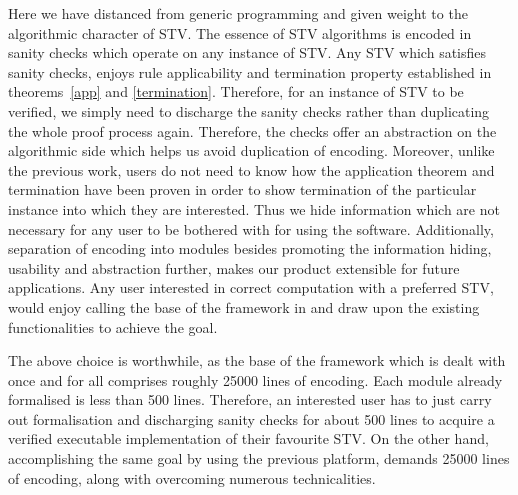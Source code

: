 \documentclass{llncs}
\begin{document}
Here we have distanced from generic programming and given weight to the algorithmic character of STV. The essence of STV algorithms is encoded in sanity checks which operate on any instance of STV. Any STV which satisfies sanity checks, enjoys rule applicability and termination property established in theorems~\ref{app} and \ref{termination}. Therefore, for an instance of STV to be verified, we simply need to discharge the sanity checks rather than duplicating the whole proof process again. Therefore, the checks offer an abstraction on the algorithmic side which helps us avoid duplication of encoding. Moreover, unlike the previous work, users do not need to know how the application theorem and termination have been proven in order to show termination of the particular instance into which they are interested.  Thus we hide information which are not necessary for any user to be bothered with for using the software. Additionally, separation of encoding into modules besides promoting the information hiding, usability and abstraction further, makes our product extensible for future applications. Any user interested in correct computation with a preferred STV, would enjoy calling the base of the framework in and draw upon the existing functionalities to achieve the goal.

The above choice is worthwhile, as the base of the framework which is dealt with once and for all comprises roughly 25000 lines of encoding. Each module already formalised is less than 500 lines. Therefore, an interested user has to just carry out formalisation and discharging sanity checks for about 500 lines to acquire a verified executable implementation of their favourite STV. On the other hand, accomplishing the same goal by using the previous platform, demands  25000 lines of encoding, along with overcoming numerous technicalities.   
\end{document}
